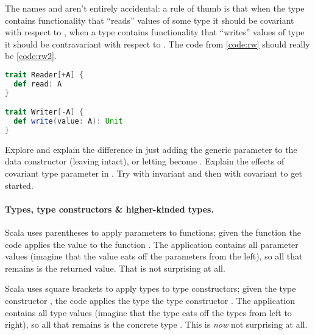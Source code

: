 \documentclass[10 pt]{article}
\begin{document}
The names  and  aren't entirely accidental: a rule of thumb is that when the type contains functionality that ``reads'' values of some type  it should be covariant with respect to , when a type contains functionality that ``writes'' values of type  it should be contravariant with respect to . The code from \autoref{code:rw} should really be \autoref{code:rw2}.

\begin{lstlisting}[caption={Reader and Writer with proper variance}, label={code:rw2}, language=Scala, escapechar=|]
trait Reader[+A] {
  def read: A
}

trait Writer[-A] {
  def write(value: A): Unit
}
\end{lstlisting}

\begin{example}
Explore and explain the difference in just adding the generic parameter to the  data constructor (leaving  intact), or letting  become . Explain the effects of covariant type parameter in . Try  with invariant  and then with covariant  to get started.
\end{example}

\paragraph{Types, type constructors \& higher-kinded types.} Scala uses parentheses to apply parameters to functions; given the function  the code  applies the value  to the function . The application contains all parameter values (imagine that the value  eats off the parameters from the left), so all that remains is the returned  value. That is not surprising at all.

Scala uses square brackets to apply types to type constructors; given the type constructor , the code  applies the type  the type constructor . The application contains all type values (imagine that the type  eats off the types from left to right), so all that remains is the concrete type . This is \emph{now} not surprising at all.
\end{document}

